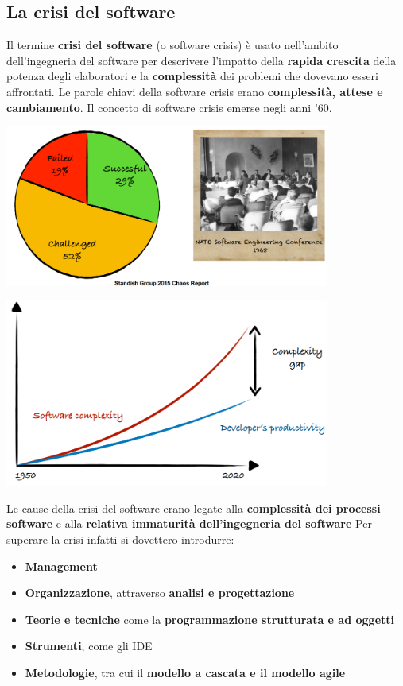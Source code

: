 \documentclass[12pt]{article}
\begin{document}
\subsection{La crisi del software}
Il termine \textbf{crisi del software} (o software crisis) è usato nell'ambito dell'ingegneria del software per descrivere l'impatto della \textbf{rapida crescita} della potenza degli elaboratori
e la \textbf{complessità} dei problemi che dovevano esseri affrontati. Le parole chiavi della software crisis erano \textbf{complessità, attese e cambiamento}. Il concetto di software crisis emerse negli
anni '60.
\begin{center}
    \includegraphics[width = 0.80\textwidth]{Images/3.png}
\end{center}
\begin{center}
    \includegraphics[width = 0.80\textwidth]{Images/4.png}
\end{center}
Le cause della crisi del software erano legate alla \textbf{complessità dei processi software} e alla \textbf{relativa immaturità dell'ingegneria del software}
Per superare la crisi infatti si dovettero introdurre:
\begin{itemize}
    \item \textbf{Management}
    \item \textbf{Organizzazione}, attraverso \textbf{analisi e progettazione}
    \item \textbf{Teorie e tecniche} come la \textbf{programmazione strutturata e ad oggetti}
    \item \textbf{Strumenti}, come gli IDE
    \item \textbf{Metodologie}, tra cui il \textbf{modello a cascata e il modello agile}
\end{itemize}
\end{document}
